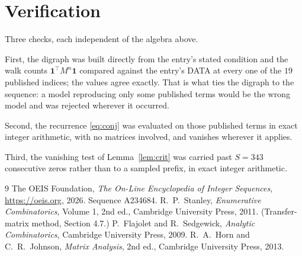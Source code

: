 \documentclass[11pt,a4paper]{article}
\theoremstyle{plain}
\theoremstyle{definition}
\begin{document}
\section{Verification}

Three checks, each independent of the algebra above.

First, the digraph was built directly from the entry's stated condition and the walk counts
$\mathbf{1}^{\!\top}M^{n}\mathbf{1}$ compared against the entry's DATA at every one of
the $19$ published indices; the values agree exactly. That is what ties the digraph to
the sequence: a model reproducing only some published terms would be the wrong model and
was rejected wherever it occurred.

Second, the recurrence \eqref{eq:conj} was evaluated on those published terms in exact
integer arithmetic, with no matrices involved, and vanishes wherever it applies.

Third, the vanishing test of Lemma~\ref{lem:crit} was carried past $S=343$ consecutive
zeros rather than to a sampled prefix, in exact integer arithmetic.

\begin{thebibliography}{9}
 The OEIS Foundation, \emph{The On-Line Encyclopedia of Integer
Sequences}, \url{https://oeis.org}, 2026. Sequence A234684.
 R.~P.~Stanley, \emph{Enumerative Combinatorics}, Volume 1, 2nd ed.,
Cambridge University Press, 2011. (Transfer-matrix method, Section 4.7.)
 P.~Flajolet and R.~Sedgewick, \emph{Analytic Combinatorics}, Cambridge
University Press, 2009.
 R.~A.~Horn and C.~R.~Johnson, \emph{Matrix Analysis}, 2nd ed., Cambridge
University Press, 2013.
\end{thebibliography}
\end{document}
